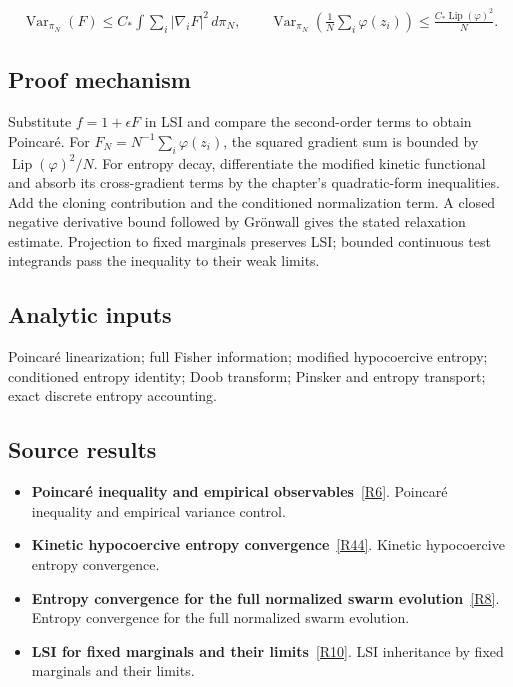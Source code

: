 \documentclass[11pt,a4paper]{article}
\begin{document}
\begin{gather*}
\operatorname{Var}_{\pi_N}(F)\le C_*\int\sum_i|\nabla_iF|^2\,d\pi_N,\qquad
\operatorname{Var}_{\pi_N}\!\left(\frac1N\sum_i\varphi(z_i)\right)\le\frac{C_*\operatorname{Lip}(\varphi)^2}{N}.
\end{gather*}
\subsection*{Proof mechanism}
Substitute \(f=1+\epsilon F\) in LSI and compare the second-order terms to obtain Poincar\'e. For \(F_N=N^{-1}\sum_i\varphi(z_i)\), the squared gradient sum is bounded by \(\operatorname{Lip}(\varphi)^2/N\). For entropy decay, differentiate the modified kinetic functional and absorb its cross-gradient terms by the chapter's quadratic-form inequalities. Add the cloning contribution and the conditioned normalization term. A closed negative derivative bound followed by Gr\"onwall gives the stated relaxation estimate. Projection to fixed marginals preserves LSI; bounded continuous test integrands pass the inequality to their weak limits.
\subsection*{Analytic inputs}
Poincar\'e linearization; full Fisher information; modified hypocoercive entropy; conditioned entropy identity; Doob transform; Pinsker and entropy transport; exact discrete entropy accounting.
\subsection*{Source results}
\begin{itemize}
\item \textbf{Poincaré inequality and empirical observables}~\hyperref[src:cor-quantitative-lsi-final]{[R6]}. Poincar\'e inequality and empirical variance control.
\item \textbf{Kinetic hypocoercive entropy convergence}~\hyperref[src:thm-villani-hypocoercivity]{[R44]}. Kinetic hypocoercive entropy convergence.
\item \textbf{Entropy convergence for the full normalized swarm evolution}~\hyperref[src:thm-kl-convergence-euclidean]{[R8]}. Entropy convergence for the full normalized swarm evolution.
\item \textbf{LSI for fixed marginals and their limits}~\hyperref[src:cor-kl-lsi-mean-field-limit]{[R10]}. LSI inheritance by fixed marginals and their limits.
\end{itemize}
\end{document}

